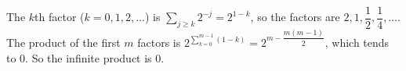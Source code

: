 The $k$th factor ($k=0,1,2,\dots$) is $\displaystyle\sum_{j\ge k}2^{-j}=2^{1-k}$, so the factors are $2,1,\dfrac12,\dfrac14,\dots$. The product of the first $m$ factors is $2^{\sum_{k=0}^{m-1}(1-k)}=2^{m-\dfrac{m(m-1)}{2}}$, which tends to $0$. So the infinite product is $\boxed{0}$.
